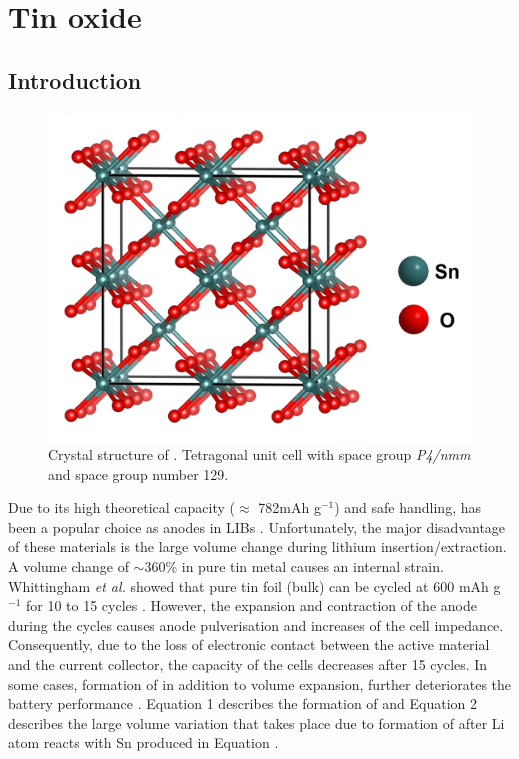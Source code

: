 \section{Tin oxide}

\subsection{Introduction}

\begin{figure}[th!]
  \centering
  \includegraphics[width=\textwidth]{Figures/chap6fig/SnO2crys}
    \caption{Crystal structure of . Tetragonal unit cell with space group \textit{P4/nmm} and space group number 129.}
  \label{Figures/chap6fig:SnO2crys}
  \end{figure}
  
Due to its high theoretical capacity ($\approx$ 782mAh g$^{-1}$) and safe handling,  has been a popular choice as anodes in LIBs  \cite{idota_tin-based_1997}. Unfortunately, the major disadvantage of these materials is the large volume change during lithium insertion/extraction. A volume change of $\sim$360\% in pure tin metal causes an internal strain. Whittingham \textit{et al.} showed that pure tin foil (bulk) can be cycled at 600 mAh g$^{-1}$ for 10 to 15 cycles \cite{yang_anodes_2003}. However, the expansion and contraction of the anode during the cycles causes anode pulverisation and increases of the cell impedance. Consequently, due to the loss of electronic contact between the active material and the current collector, the capacity of the cells decreases after 15 cycles. In some cases, formation of  in addition to volume expansion, further deteriorates the battery performance \cite{zhao_tin-based_2016}. Equation 1 describes the formation of  and Equation 2 describes the large volume variation that takes place due to formation of  after Li atom reacts with Sn produced in Equation \cite{park_effect_2008}.

